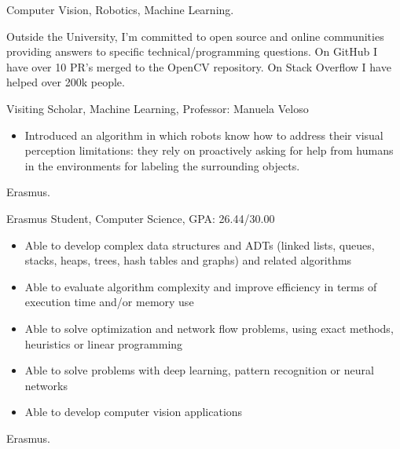 \documentclass{article}
\begin{document}


\begin{llist}


Computer Vision, Robotics, Machine Learning.

Outside the University, I'm committed to open source and online communities providing answers to specific technical/programming questions. On GitHub I have over 10 PR's merged to the OpenCV repository. On Stack Overflow I have helped over 200k people.


 
{
Visiting Scholar, Machine Learning, Professor: Manuela Veloso
\begin{itemize}
\item[\textendash] Introduced an algorithm in which robots know how to address their visual perception limitations: they rely on proactively asking for help from humans in the environments for labeling the surrounding objects.
\end{itemize}
}
{
Erasmus.
}

 
{
Erasmus Student, Computer Science, GPA: 26.44/30.00
\begin{itemize}
\item[\textendash] Able to develop complex data structures and ADTs (linked lists, queues, stacks, heaps, trees, hash tables and graphs) and related algorithms
\item[\textendash] Able to evaluate algorithm complexity and improve efficiency in terms of execution time and/or memory use
\item[\textendash] Able to solve optimization and network flow problems, using exact methods, heuristics or linear programming
\item[\textendash] Able to solve problems with deep learning, pattern recognition or neural networks
\item[\textendash] Able to develop computer vision applications
\end{itemize}
}
{
Erasmus.
}


\end{llist}
\end{document}
